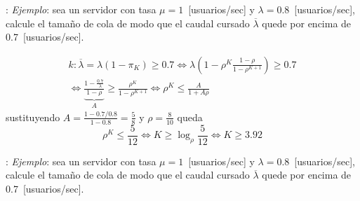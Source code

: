 \documentclass[xcolor={x11names}]{beamer}
\begin{document}
\begin{frame}{\secname: \subsecname}
    \textit{Ejemplo}: sea un servidor con
    tasa $\mu=1$~[usuarios/sec] y
    $\lambda=0.8$~[usuarios/sec], calcule
    el tamaño de cola de modo que el
    caudal cursado $\overline{\lambda}$
    quede por encima de 0.7~[usuarios/sec].

    \vfill

    \begin{multline*}
        k: \overline{\lambda}=
        \lambda(1-\pi_K)\geq0.7
        \Longleftrightarrow
        \lambda\left(1-\rho^K\frac{1-\rho}{1-\rho^{K+1}} \right)
        \geq0.7\\
        \Longleftrightarrow
        \underbrace{\frac{1-\frac{0.7}{\lambda}}{1-\rho}}_{A}
        \geq \frac{\rho^K}{1-\rho^{K+1}}
        \Longleftrightarrow
        \rho^K\leq \frac{A}{1+A\rho}
    \end{multline*}
    sustituyendo $A=\tfrac{1-0.7/0.8}{1-0.8}=\tfrac{5}{8}$
    y $\rho=\tfrac{8}{10}$
    queda
    \begin{equation*}
        \rho^K\leq\frac{5}{12}
        \Longleftrightarrow
        K\geq\log_\rho\frac{5}{12}
        \Longleftrightarrow
        K\geq 3.92
    \end{equation*}
\end{frame}




\begin{frame}{\secname: \subsecname}
    \textit{Ejemplo}: sea un servidor con
    tasa $\mu=1$~[usuarios/sec] y
    $\lambda=0.8$~[usuarios/sec], calcule
    el tamaño de cola de modo que el
    caudal cursado $\overline{\lambda}$
    quede por encima de 0.7~[usuarios/sec].

    \vfill

    \begin{figure}
        
    \end{figure}
\end{frame}
\end{document}
